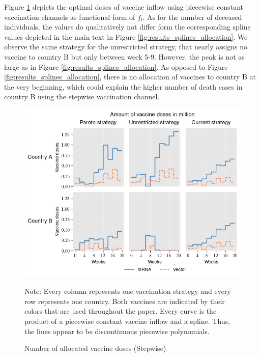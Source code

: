 Figure \ref{fig:results_piecewise_allocation} depicts the optimal doses of vaccine inflow using piecewise constant vaccination channels as functional form of $f_l$. As for the number of deceased individuals, the values do qualitatively not differ form the corresponding spline values depicted in the main text in Figure \ref{fig:results_splines_allocation}. We observe the same strategy for the unrestricted strategy, that nearly assigns no vaccine to country B but only between week 5-9. However, the peak is not as large as in Figure \ref{fig:results_splines_allocation}. As opposed to Figure \ref{fig:results_splines_allocation}, there is no allocation of vaccines to country B at the very beginning, which could explain the higher number of death cases in country B using the stepwise vaccination channel. \\

\begin{figure}[h!]
\centering
\includegraphics[scale=0.65]{images/piecewise_vaccine_total_quantity.png}\\
\begin{flushleft}
\scriptsize{Note:} Every column represents one vaccination strategy and every row represents one country. Both vaccines are indicated by their colors that are used throughout the paper. 
Every curve is the product of a piecewise constant vaccine inflow and a spline. Thus, the lines appear to be discontinuous piecewise polynomials. 
\end{flushleft}
\caption{Number of allocated vaccine doses (Stepwise)}
\label{fig:results_piecewise_allocation}
\end{figure}

